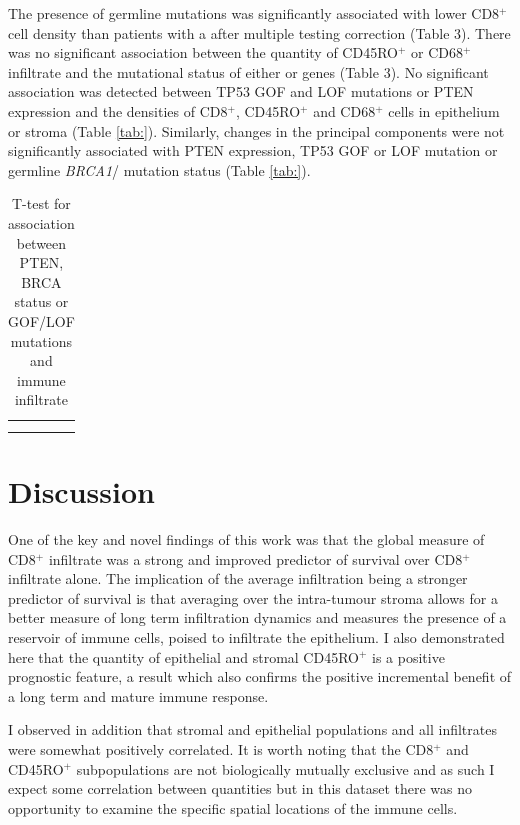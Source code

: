 The presence of germline  mutations was significantly associated with lower CD8$^+$ cell density than patients with a  after multiple testing correction (Table 3). There was no significant association between the quantity of CD45RO$^+$ or CD68$^+$ infiltrate and the mutational status of either  or  genes (Table 3). No significant association was detected between TP53 GOF and LOF mutations or PTEN expression and the densities of CD8$^+$, CD45RO$^+$ and CD68$^+$ cells in epithelium or stroma (Table \ref{tab:}). Similarly, changes in the principal components were not significantly associated with PTEN expression, TP53 GOF or LOF mutation or germline \textit{BRCA1}/ mutation status (Table \ref{tab:}).

\begin{table}[]
    \centering
    \begin{tabular}{c|c}
         &  \\
         & 
    \end{tabular}
    \caption{T-test for association between PTEN, BRCA status or GOF/LOF mutations and immune infiltrate }
    \label{tab:my_label}
\end{table}


\clearpage

\section{Discussion}
 One of the key and novel findings of this work was that the global measure of CD8$^+$ infiltrate was a strong and improved predictor of survival over CD8$^+$ infiltrate alone. The implication of the average infiltration being a stronger predictor of survival is that averaging over the intra-tumour stroma allows for a better measure of long term infiltration dynamics and measures the presence of a reservoir of immune cells, poised to infiltrate the epithelium.  I also demonstrated here that the quantity of epithelial and stromal CD45RO$^+$ is a positive prognostic feature, a result which also confirms the positive incremental benefit of a long term and mature immune response. 
 
 I observed in addition that stromal and epithelial populations and all infiltrates were somewhat positively correlated. It is worth noting that the  CD8$^+$ and  CD45RO$^+$ subpopulations are not biologically mutually exclusive and as such I expect some correlation between quantities but in this dataset there was no opportunity to examine the specific spatial locations of the immune cells. 

